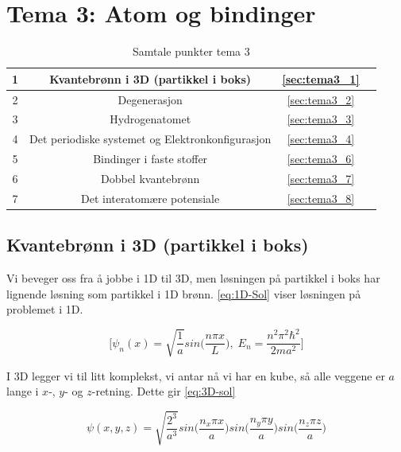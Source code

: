 \section{Tema 3: Atom og bindinger}
\label{tema3}

\begin{table}[!htb]
    \centering
    \caption{Samtale punkter tema 3}
    \begin{tabular}{|c|c|c|r|}
      \hline
      1 & Kvantebrønn i 3D (partikkel i boks) &  \autoref{sec:tema3_1} & \cellcolor{blue}\quad\quad \\
      \hline 
      2 & Degenerasjon & \autoref{sec:tema3_2} & \cellcolor{blue} \\
      \hline
      3 & Hydrogenatomet & \autoref{sec:tema3_3} & \cellcolor{blue} \\
      \hline
      4 & Det periodiske systemet og Elektronkonfigurasjon & \autoref{sec:tema3_4} & \cellcolor{blue} \\
      \hline 
      5 & Bindinger i faste stoffer & \autoref{sec:tema3_6} & \cellcolor{green} \\ 
      \hline
      6 & Dobbel kvantebrønn & \autoref{sec:tema3_7} & \cellcolor{blue} \\
      \hline
      7 & Det interatomære potensiale & \autoref{sec:tema3_8} & \cellcolor{blue} \\
      \hline
    \end{tabular}
    \label{tab:samtalePunkt_tema1}
\end{table}

\subsection{Kvantebrønn i 3D (partikkel i boks)}
\label{sec:tema3_1}
Vi beveger oss fra å jobbe i 1D til 3D, men løsningen på partikkel i boks har lignende løsning som partikkel i 1D brønn. \autoref{eq:1D-Sol} viser løsningen på problemet i 1D.

\begin{equation}
\label{eq:1D-Sol}
    \bigg[
    \psi_n(x) = \sqrt{\frac{1}{a}}sin\bigg(\frac{n\pi x}{L}\bigg),
    \;E_n = \frac{n^2\pi^2\hbar^2}{2ma^2}
    \bigg]
\end{equation}

I 3D legger vi til litt komplekst, vi antar nå vi har en kube, så alle veggene er $a$ lange i $x$-, $y$- og $z$-retning. Dette gir \ref{eq:3D-sol}

\begin{equation}
    \label{eq:3D-sol}
    \psi(x,y,z) = \sqrt{\frac{2^3}{a^3}}
    sin\bigg(\frac{n_x\pi x}{a}\bigg)
    sin\bigg(\frac{n_y\pi y}{a}\bigg)
    sin\bigg(\frac{n_z\pi z}{a}\bigg)
\end{equation}

